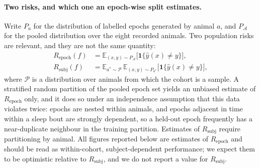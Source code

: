 \paragraph{Two risks, and which one an epoch-wise split estimates.}
Write $P_a$ for the distribution of labelled epochs generated by animal $a$, and $P_{\mathcal{A}}$ for the pooled distribution over the eight recorded animals. Two population risks are relevant, and they are not the same quantity:
\begin{equation}
\begin{aligned}
R_{\mathrm{epoch}}(f) &= \mathbb{E}_{(x,y)\sim P_{\mathcal{A}}}\big[\mathbf{1}\{\hat{y}(x)\neq y\}\big],\\[2pt]
R_{\mathrm{subj}}(f)  &= \mathbb{E}_{a^{*}\sim \mathcal{P}}\,\mathbb{E}_{(x,y)\sim P_{a^{*}}}\big[\mathbf{1}\{\hat{y}(x)\neq y\}\big],
\end{aligned}
\label{eq:risks}
\end{equation}
where $\mathcal{P}$ is a distribution over animals from which the cohort is a sample. A stratified random partition of the pooled epoch set yields an unbiased estimate of $R_{\mathrm{epoch}}$ only, and it does so under an independence assumption that this data violates twice: epochs are nested within animals, and epochs adjacent in time within a sleep bout are strongly dependent, so a held-out epoch frequently has a near-duplicate neighbour in the training partition. Estimates of $R_{\mathrm{subj}}$ require partitioning by animal. All figures reported below are estimates of $R_{\mathrm{epoch}}$ and should be read as within-cohort, subject-dependent performance; we expect them to be optimistic relative to $R_{\mathrm{subj}}$, and we do not report a value for $R_{\mathrm{subj}}$.

